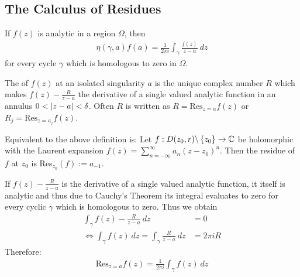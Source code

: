 \subsection{The Calculus of Residues}

\begin{theorem}
    If $f(z)$ is analytic in a region $\Omega$, then
    \begin{align*}
        \eta(\gamma,a) f(a) = \frac{1}{2 \pi i} \int_\gamma \frac{f(z)}{z - a} \ dz
    \end{align*}
    for every cycle $\gamma$ which is homologous to zero in $\Omega$.
\end{theorem}

\begin{definition}[Residue]
    The  of $f(z)$ at an isolated singularity $a$ is the unique complex
    number $R$ which makes $f(z) - \frac{R}{z-a}$ the derivative of a single valued
    analytic function in an annulus $0 < \left\vert z-a \right\vert < \delta$. Often $R$ is written as
    $R = \text{Res}_{z=a} f(z)$ or $R_j = \text{Res}_{z=a_j} f(z)$.
\end{definition}

\begin{definition}[Residue]
    Equivalent to the above definition is:
    Let $f: D(z_0,r) \backslash \left\{ z_0 \right\} \rightarrow \mathbb{C}$ be
    holomorphic with the Laurent expansion $f(z) = \sum_{n=-\infty}^\infty a_n
    (z-z_0)^n$. Then the residue of $f$ at $z_0$ is Res$_{z_0} (f) := a_{-1}$.    
\end{definition}

\begin{theorem}
    If $f(z) - \frac{R}{z-a}$ is the derivative of a single valued analytic function,
    it itself is analytic and thus due to Cauchy's Theorem its integral evaluates to
    zero for every cyclic $\gamma$ which is homologous to zero. Thus we obtain
    \begin{align*}
        \int_\gamma f(z) - \frac{R}{z-a} \ dz &= 0
        \\
        \Leftrightarrow
        \int_\gamma f(z) \ dz = \int_\gamma \frac{R}{z-a} \ dz &= 2 \pi i R
    \end{align*}
    Therefore:
    \begin{align*}
        \text{Res}_{z=a} f(z) = \frac{1}{2 \pi i} \int_\gamma f(z) \ dz
    \end{align*}
\end{theorem}

